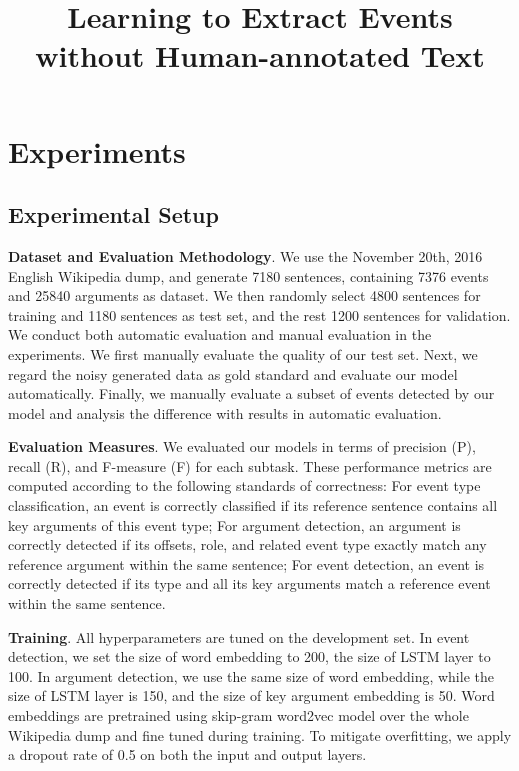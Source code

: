 \documentclass{article}
\title{Learning to Extract Events without Human-annotated Text}
\begin{document}
\maketitle









\section{Experiments}
\subsection{Experimental Setup}
\textbf{Dataset and Evaluation Methodology}. We use the November 20th, 2016 English Wikipedia dump, and generate 7180 sentences, containing 7376 events and 25840 arguments as dataset. We then randomly select 4800 sentences for training and 1180 sentences as test set, and the rest 1200 sentences for validation. We conduct both automatic evaluation and manual evaluation in the experiments. We first manually evaluate the quality of our test set. Next, we regard the noisy generated data as gold standard and evaluate our model automatically. Finally, we manually evaluate a subset of events detected by our model and analysis the difference with results in automatic evaluation.

\noindent \textbf{Evaluation Measures}. We evaluated our models in terms of precision (P), recall (R), and F-measure (F) for each subtask. These performance metrics are computed according to the following standards of correctness: For event type classification, an event is correctly classified if its reference sentence contains all key arguments of this event type; For argument detection, an argument is correctly detected if its offsets, role, and related event type exactly match any reference argument within the same sentence; For event detection, an event is correctly detected if its type and all its key arguments match a reference event within the same sentence.

\noindent \textbf{Training}. All hyperparameters are tuned on the development set. In event detection, we set the size of word embedding to 200, the size of LSTM layer to 100. In argument detection, we use the same size of word embedding, while the size of LSTM layer is 150, and the size of key argument embedding is 50. Word embeddings are pretrained using skip-gram word2vec model \cite{mikolov2013distributed} over the whole Wikipedia dump and fine tuned during training. To mitigate overfitting, we apply a dropout rate of 0.5 on both the input and output layers. 
\end{document}
